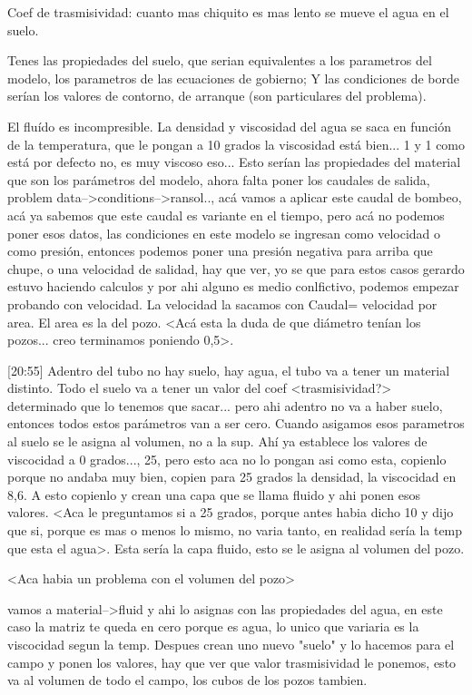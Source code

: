 \documentclass[10pt,a4paper,final]{article}
\begin{document}
Coef de trasmisividad: cuanto mas chiquito es mas lento se mueve el agua en el suelo.

Tenes las propiedades del suelo, que serian equivalentes a los parametros del modelo, los parametros de las ecuaciones de gobierno; Y las condiciones de borde serían los valores de contorno, de arranque (son particulares del problema).

El fluído es incompresible. La densidad y viscosidad del agua se saca en función de la temperatura, que le pongan a 10 grados la viscosidad está bien... 1 y 1 como está por defecto no, es muy viscoso eso... Esto serían las propiedades del material que son los parámetros del modelo, ahora falta poner los caudales de salida, problem data-->conditions-->ransol.., acá vamos a aplicar este caudal de bombeo, acá ya sabemos que este caudal es variante en el tiempo, pero acá no podemos poner esos datos, las condiciones en este modelo se ingresan como velocidad o como presión, entonces podemos poner una presión negativa para arriba que chupe, o una velocidad de salidad, hay que ver, yo se que para estos casos gerardo estuvo haciendo calculos y por ahi alguno es medio conlfictivo, podemos empezar probando con velocidad. La velocidad la sacamos con Caudal= velocidad por area. El area es la del pozo. <Acá esta la duda de que diámetro tenían los pozos... creo terminamos poniendo 0,5>. 

[20:55]
Adentro del tubo no hay suelo, hay agua, el tubo va a tener un material distinto. Todo el suelo va a tener un valor del coef <trasmisividad?> determinado que lo tenemos que sacar... pero ahi adentro no va a haber suelo, entonces todos estos parámetros van a ser cero. Cuando asigamos esos parametros al suelo se le asigna al volumen, no a la sup. Ahí ya establece los valores de viscocidad a 0 grados..., 25, pero esto aca no lo pongan asi como esta, copienlo porque no andaba muy bien, copien para 25 grados la densidad, la viscocidad en 8,6. A esto copienlo y crean una capa que se llama fluido y ahi ponen esos valores. <Aca le preguntamos si a 25 grados, porque antes habia dicho 10 y dijo que si, porque es mas o menos lo mismo, no varia tanto, en realidad sería la temp que esta el agua>. Esta sería la capa fluido, esto se le asigna al volumen del pozo.

<Aca habia un problema con el volumen del pozo>

vamos a material-->fluid y ahi lo asignas con las propiedades del agua, en este caso la matriz te queda en cero porque es agua, lo unico que variaria es la viscocidad segun la temp. Despues crean uno nuevo "suelo" y lo hacemos para el campo y ponen los valores, hay que ver que valor trasmisividad le ponemos, esto va al volumen de todo el campo, los cubos de los pozos tambien.
\end{document}

